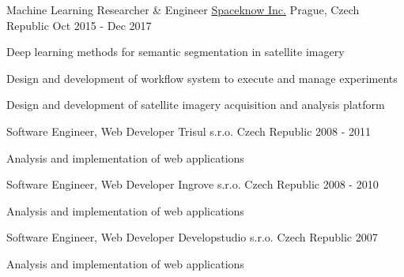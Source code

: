 \begin{cventries}
\cventry
{Machine Learning Researcher \& Engineer} %
{\href{http://spaceknow.com}{Spaceknow Inc.}} %
{Prague, Czech Republic} %
{Oct 2015 - Dec 2017} %
{
	\begin{cvitems} %
		\item {Deep learning methods for semantic segmentation in satellite imagery %
		}
		\item {Design and development of workflow system to execute and manage experiments}
		\item {Design and development of satellite imagery acquisition and analysis platform}
	\end{cvitems}
}

\cventry
{Software Engineer, Web Developer} %
{Trisul s.r.o.} %
{Czech Republic} %
{2008 - 2011} %
{
	\begin{cvitems} %
		\item {Analysis and implementation of web applications %
		}
	\end{cvitems}
}

\cventry
{Software Engineer, Web Developer} %
{Ingrove s.r.o.} %
{Czech Republic} %
{2008 - 2010} %
{
	\begin{cvitems} %
		\item {Analysis and implementation of web applications %
		}
	\end{cvitems}
}

\cventry
{Software Engineer, Web Developer} %
{Developstudio s.r.o.} %
{Czech Republic} %
{2007} %
{
	\begin{cvitems} %
		\item {Analysis and implementation of web applications %
		}
	\end{cvitems}
}

\end{cventries}
